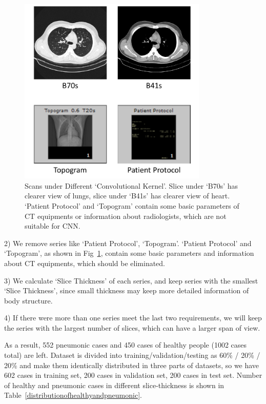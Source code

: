 \documentclass[journal]{IEEEtran}
\begin{document}
\begin{figure}[t]
    \centerline{\includegraphics[width=90mm]{Bs.pdf}}
    \vspace{-0cm}
    \caption{Scans under Different `Convolutional Kernel'. Slice under `B70s' has clearer view of lungs, slice under `B41s' has clearer view of heart. `Patient Protocol' and `Topogram' contain some basic parameters of CT equipments or information about radiologists, which are not suitable for CNN.}
    \vspace{-0cm}
    \label{Bs}
    \end{figure}

2) We remove series like `Patient Protocol', `Topogram'. `Patient Protocol' and `Topogram', as shown in Fig~\ref{Bs}, contain some basic parameters and information about CT equipments, which should be eliminated.

3) We calculate `Slice Thickness' of each series, and keep series with the smallest `Slice Thickness', since small thickness may keep more detailed information of body structure. 

4) If there were more than one series meet the last two requirements, we will keep the series with the largest number of slices, which can have a larger span of view.

As a result, 552 pneumonic cases and 450 cases of healthy people (1002 cases total) are left.
Dataset is divided into training/validation/testing as 60\% / 20\% / 20\% and make them identically distributed in three parts of datasets, so we have 602 cases in training set, 200 cases in validation set, 200 cases in test set.
Number of healthy and pneumonic cases in different slice-thickness is shown in Table~\ref{distributionofhealthyandpneumonic}.
\end{document}
